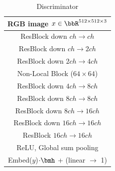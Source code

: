 \begin{table}[ht]
\begin{subtable}{.4\textwidth}
{\begin{tabular}{c}
                  \toprule
                  \midrule
                  RGB image $x\in \bbR^{512 \times 512 \times 3}$ \\
                  \midrule
                  ResBlock down $ch \rightarrow ch$\\
                  \midrule
                  ResBlock down $ch \rightarrow 2ch$\\
                  \midrule
                  ResBlock down $2ch \rightarrow 4ch$\\
                  \midrule
                  Non-Local Block ($64\times 64$) \\
                  \midrule
                  ResBlock down $4ch \rightarrow 8ch$\\
                  \midrule
                  ResBlock down $8ch \rightarrow 8ch$\\
                  \midrule
                  ResBlock down $8ch \rightarrow 16ch$\\
                  \midrule
                  ResBlock down $16ch \rightarrow 16ch$\\
                  \midrule
                  ResBlock $16ch \rightarrow 16ch$\\
                  \midrule
                  ReLU, Global sum pooling\\
                  \midrule
                  Embed($y$)$\cdot \bmh$ + (linear $\rightarrow$ 1) \\
                  \midrule
                  \bottomrule
              \end{tabular}}
              \caption{\label{tab:dis_resnet_imagenet_512} Discriminator}
          \end{subtable}
\end{table}

